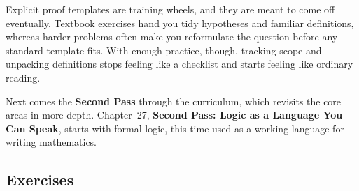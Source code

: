 Explicit proof templates are training wheels, and they are meant to come off eventually. Textbook exercises hand you tidy hypotheses and familiar definitions, whereas harder problems often make you reformulate the question before any standard template fits. With enough practice, though, tracking scope and unpacking definitions stops feeling like a checklist and starts feeling like ordinary reading.

Next comes the \textbf{Second Pass} through the curriculum, which revisits the core areas in more depth. Chapter~27, \textbf{Second Pass: Logic as a Language You Can Speak}, starts with formal logic, this time used as a working language for writing mathematics.

\subsection{Exercises}
\label{26:sec-exercises}

